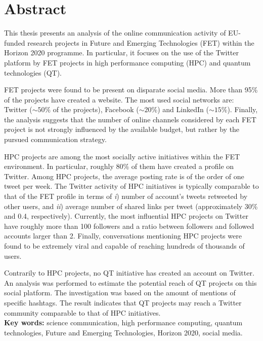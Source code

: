 \chapter*{Abstract}
This thesis presents an analysis of the online communication activity of EU-funded research projects in Future and Emerging Technologies (FET) within the Horizon 2020 programme. In particular, it focuses on the use of the Twitter platform by FET projects in high performance computing (HPC) and quantum technologies (QT).

FET projects were found to be present on disparate social media. More than 95\% of the projects have created a website. The most used social networks are: Twitter ($\sim 50\%$ of the projects), Facebook ($\sim 20\%$) and LinkedIn ($\sim 15\%$). Finally, the analysis suggests that the number of online channels considered by each FET project is not strongly influenced by the available budget, but rather by the pursued communication strategy.

HPC projects are among the most socially active initiatives within the FET environment. In particular, roughly 80\% of them have created a profile on Twitter. Among HPC projects, the average posting rate is of the order of one tweet per week. The Twitter activity of HPC initiatives is typically comparable to that of the FET profile in terms of \textit{i}) number of account's tweets retweeted by other users, and \textit{ii}) average number of shared links per tweet (approximately 30\% and 0.4, respectively). Currently, the most influential HPC projects on Twitter have roughly more than 100 followers and a ratio between followers and followed accounts larger than 2. Finally, conversations mentioning HPC projects were found to be extremely viral and capable of reaching hundreds of thousands of users.

Contrarily to HPC projects, no QT initiative has created an account on Twitter. An analysis was performed to estimate the potential reach of QT projects on this social platform. The investigation was based on the amount of mentions of specific hashtags. The result indicates that QT projects may reach a Twitter community comparable to that of HPC initiatives. \\

\noindent
\textbf{Key words:} science communication, high performance computing, quantum technologies, Future and Emerging Technologies, Horizon 2020, social media.